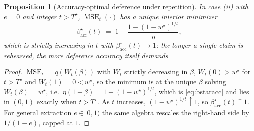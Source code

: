 \documentclass[11pt]{article}
\newtheorem{proposition}[theorem]{Proposition}
\theoremstyle{definition}
\theoremstyle{remark}
\numberwithin{equation}{section}
\DeclareMathOperator{\MSE}{MSE}
\begin{document}
\begin{proposition}[Accuracy-optimal deference under repetition]\label{prop:bstar}
In case (ii) with $e = 0$ and integer $t > T^\star$, $\MSE_t(\cdot)$ has a unique interior minimizer
\begin{equation}\label{eq:bstaracc}
\beta^\star_{\mathrm{acc}}(t) \;=\; 1 - \frac{1-(1-w^\star)^{1/t}}{\eta},
\end{equation}
which is strictly increasing in $t$ with $\beta^\star_{\mathrm{acc}}(t) \to 1$: the longer a single claim is rehearsed, the more deference accuracy itself demands.
\end{proposition}
\begin{proof}
$\MSE_t = q(W_t(\beta))$ with $W_t$ strictly decreasing in $\beta$, $W_t(0) > w^\star$ for $t > T^\star$ and $W_t(1) = 0 < w^\star$, so the minimum is at the unique $\beta$ solving $W_t(\beta) = w^\star$, i.e.\ $\eta(1-\beta) = 1-(1-w^\star)^{1/t}$, which is \eqref{eq:bstaracc} and lies in $(0,1)$ exactly when $t > T^\star$. As $t$ increases, $(1-w^\star)^{1/t} \uparrow 1$, so $\beta^\star_{\mathrm{acc}}(t) \uparrow 1$. For general extraction $e \in [0,1)$ the same algebra rescales the right-hand side by $1/(1-e)$, capped at $1$.
\end{proof}
\end{document}
